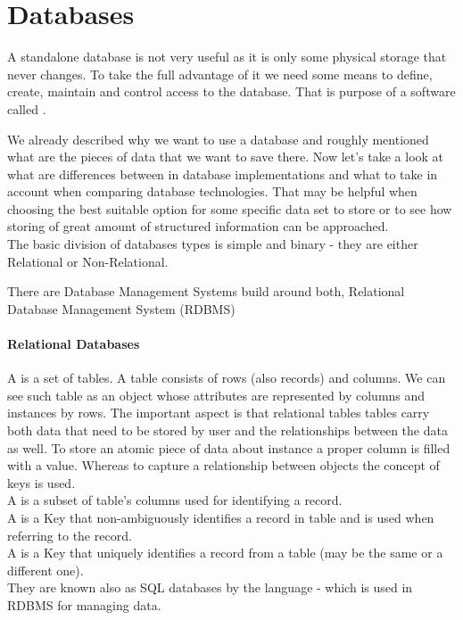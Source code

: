 \chapter{Databases}

A standalone database is not very useful as it is only some physical storage that never changes. To take the full advantage of it we need some means to define, create, maintain and control access to the database. That is purpose of a software called .

We already described why we want to use a database and roughly mentioned what are the pieces of data that we want to save there. 
Now let's take a look at what are differences between in database implementations and what to take in account when comparing database technologies.
That may be helpful when choosing the best suitable option for some specific data set to store or to see how storing of great amount of structured information can be approached. \\ 

The basic division of databases types is simple and binary - they are either Relational or Non-Relational.

There are Database Management Systems build around both, Relational Database Management System (RDBMS)

\subsubsection{Relational Databases}
A  is a set of tables. A table consists of rows (also records) and columns. We can see such table as an object whose attributes are represented by columns and instances by rows. 
The important aspect is that relational tables tables carry both data that need to be stored by user and the relationships between the data as well. 
To store an atomic piece of data about instance a proper column is filled with a value.
Whereas to capture a relationship between objects the concept of keys is used. \\
A  is a subset of table's columns used for identifying a record. \\
A  is a Key that non-ambiguously identifies a record in table and is used when referring to the record. \\
A  is a Key that uniquely identifies a record from a table (may be the same or a different one). \\
They are known also as SQL databases by the language -  which is used in RDBMS for managing data.

